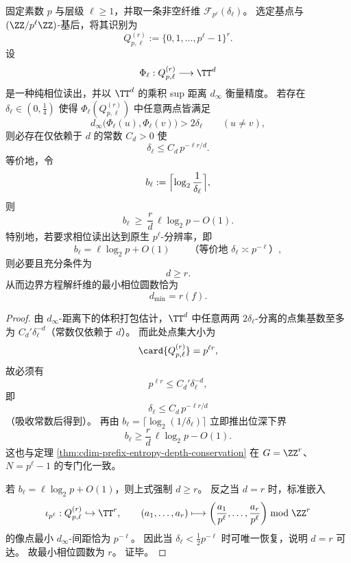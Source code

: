 \begin{theorem}[边界解纤维的最小相位圆数]\label{thm:conclusion-boundary-minimal-phase-circle-count}
固定素数 \(p\) 与层级 \(\ell\ge 1\)，并取一条非空纤维 \(\mathcal F_{p^\ell}(\delta_\ell)\)。
选定基点与 \((\ZZ/p^\ell\ZZ)\)-基后，将其识别为
\[
Q_{p,\ell}^{(r)}:=\{0,1,\dots,p^\ell-1\}^{r}.
\]
设
\[
\Phi_\ell:Q_{p,\ell}^{(r)}\longrightarrow \TT^d
\]
是一种纯相位读出，并以 \(\TT^d\) 的乘积 sup 距离 \(d_\infty\) 衡量精度。
若存在 \(\delta_\ell\in(0,\tfrac14)\) 使得 \(\Phi_\ell(Q_{p,\ell}^{(r)})\) 中任意两点皆满足
\[
d_\infty\bigl(\Phi_\ell(u),\Phi_\ell(v)\bigr)>2\delta_\ell
\qquad(u\neq v),
\]
则必存在仅依赖于 \(d\) 的常数 \(C_d>0\) 使
\[
\delta_\ell\le C_d\,p^{-\ell r/d}.
\]
等价地，令
\[
b_\ell:=\Bigl\lceil \log_2\frac{1}{\delta_\ell}\Bigr\rceil,
\]
则
\[
\boxed{\;
b_\ell\ \ge\ \frac{r}{d}\,\ell\log_2 p-O(1).
\;}
\]
特别地，若要求相位读出达到原生 \(p^\ell\)-分辨率，即
\[
b_\ell=\ell\log_2 p+O(1)
\qquad\text{（等价地 }\delta_\ell\asymp p^{-\ell}\text{）},
\]
则必要且充分条件为
\[
d\ge r.
\]
从而边界方程解纤维的最小相位圆数恰为
\[
\boxed{\;d_{\min}=r(f).\;}
\]
\end{theorem}
\begin{proof}
由 \(d_\infty\)-距离下的体积打包估计，\(\TT^d\) 中任意两两 \(2\delta_\ell\)-分离的点集基数至多为 \(C_d'\delta_\ell^{-d}\)（常数仅依赖于 \(d\)）。
而此处点集大小为
\[
\card{Q_{p,\ell}^{(r)}}=p^{\ell r},
\]
故必须有
\[
p^{\ell r}\le C_d'\delta_\ell^{-d},
\]
即
\[
\delta_\ell\le C_d\,p^{-\ell r/d}
\]
（吸收常数后得到）。
再由 \(b_\ell=\lceil \log_2(1/\delta_\ell)\rceil\) 立即推出位深下界
\[
b_\ell\ge \frac{r}{d}\,\ell\log_2 p-O(1).
\]
这也与定理 \ref{thm:cdim-prefix-entropy-depth-conservation} 在 \(G=\ZZ^r\)、\(N=p^\ell-1\) 的专门化一致。

若 \(b_\ell=\ell\log_2 p+O(1)\)，则上式强制 \(d\ge r\)。
反之当 \(d=r\) 时，标准嵌入
\[
\iota_{p^\ell}:Q_{p,\ell}^{(r)}\hookrightarrow \TT^r,
\qquad
(a_1,\dots,a_r)\longmapsto
\left(\frac{a_1}{p^\ell},\dots,\frac{a_r}{p^\ell}\right)\bmod \ZZ^r
\]
的像点最小 \(d_\infty\)-间距恰为 \(p^{-\ell}\)。
因此当 \(\delta_\ell<\tfrac12 p^{-\ell}\) 时可唯一恢复，说明 \(d=r\) 可达。
故最小相位圆数为 \(r\)。
证毕。
\end{proof}

